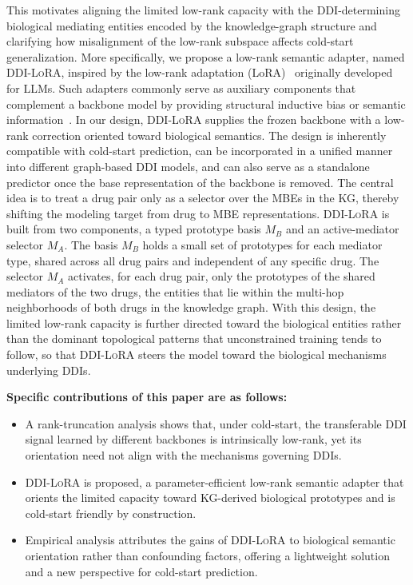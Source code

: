 \documentclass[letterpaper]{article} %
\begin{document}
This motivates aligning the limited low-rank capacity with the DDI-determining biological mediating entities encoded by the knowledge-graph structure and clarifying how misalignment of the low-rank subspace affects cold-start generalization.
%
More specifically, we propose a low-rank semantic adapter, named \textsc{DDI-LoRA}, inspired by the low-rank adaptation (LoRA)~\cite{Method-Lora-ICLR-2022} originally developed for LLMs.
%
Such adapters commonly serve as auxiliary components that complement a backbone model by providing structural inductive bias or semantic information~\cite{Method-Adapter-ICML-2019}.
%
In our design, \textsc{DDI-LoRA} supplies the frozen backbone with a low-rank correction oriented toward biological semantics.
%
The design is inherently compatible with cold-start prediction, can be incorporated in a unified manner into different graph-based DDI models, and can also serve as a standalone predictor once the base representation of the backbone is removed.
%
The central idea is to treat a drug pair only as a selector over the MBEs in the KG, thereby shifting the modeling target from drug to MBE representations.
%
\textsc{DDI-LoRA} is built from two components, a typed prototype basis $M_B$ and an active-mediator selector $M_A$. The basis $M_B$ holds a small set of prototypes for each mediator type, shared across all drug pairs and independent of any specific drug.
%
The selector $M_A$ activates, for each drug pair, only the prototypes of the shared mediators of the two drugs, the entities that lie within the multi-hop neighborhoods of both drugs in the knowledge graph.
%
With this design, the limited low-rank capacity is further directed toward the biological entities rather than the dominant topological patterns that unconstrained training tends to follow, so that \textsc{DDI-LoRA} steers the model toward the biological mechanisms underlying DDIs. 
%

\textbf{Specific contributions of this paper are as follows:}
\begin{itemize}
    \item A rank-truncation analysis shows that, under cold-start, the transferable DDI signal learned by different backbones is intrinsically low-rank, yet its orientation need not align with the mechanisms governing DDIs.
    
    \item \textsc{DDI-LoRA} is proposed, a parameter-efficient low-rank semantic adapter that orients the limited capacity toward KG-derived biological prototypes and is cold-start friendly by construction.
    
    \item Empirical analysis attributes the gains of \textsc{DDI-LoRA} to biological semantic orientation rather than confounding factors, offering a lightweight solution and a new perspective for cold-start prediction.
\end{itemize}
\end{document}
